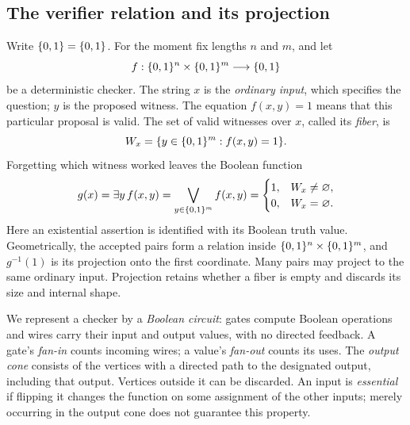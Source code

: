 \subsection{The verifier relation and its projection}

Write $\{0,1\}=\{0,1\}$. For the moment fix lengths $n$ and $m$, and let
\[
 f:\{0,1\}^n\times\{0,1\}^m\longrightarrow\{0,1\}
\]
be a deterministic checker. The string $x$ is the \emph{ordinary input},
which specifies the question; $y$ is the proposed witness. The equation
$f(x,y)=1$ means that this particular proposal is valid. The set of valid
witnesses over $x$, called its \emph{fiber}, is
\[
 W_x=\{y\in\{0,1\}^m:f(x,y)=1\}.
\]
Forgetting which witness worked leaves the Boolean function
\begin{equation}\label{eq:foundations-projection}
 g(x)=\exists y\,f(x,y)
     =\bigvee_{y\in\{0,1\}^m} f(x,y)
     =\begin{cases}1,&W_x\ne\varnothing,\\0,&W_x=\varnothing.\end{cases}
\end{equation}
Here an existential assertion is identified with its Boolean truth value.
Geometrically, the accepted pairs form a relation inside
$\{0,1\}^n\times\{0,1\}^m$, and $g^{-1}(1)$ is its projection onto the first
coordinate. Many pairs may project to the same ordinary input. Projection
retains whether a fiber is empty and discards its size and internal shape.

We represent a checker by a \emph{Boolean circuit}: gates compute Boolean
operations and wires carry their input and output values, with no directed
feedback. A gate's \emph{fan-in} counts incoming wires; a value's
\emph{fan-out} counts its uses. The \emph{output cone} consists of the
vertices with a directed path to the designated output, including that
output. Vertices outside it can be discarded. An input is \emph{essential}
if flipping it changes the function on some assignment of the other inputs;
merely occurring in the output cone does not guarantee this property.


